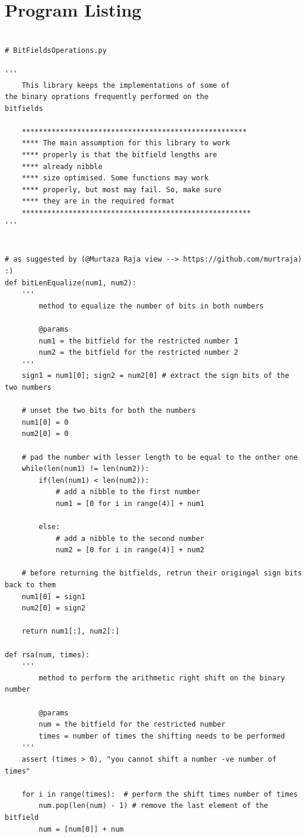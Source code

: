 \documentclass[10pt,a4paper]{article}
\newenvironment{changemargin}[2]{%
\begin{list}{}{%
\setlength{\topsep}{0pt}%
\setlength{\leftmargin}{#1}%
\setlength{\rightmargin}{#2}%
\setlength{\listparindent}{\parindent}%
\setlength{\itemindent}{\parindent}%
\setlength{\parsep}{\parskip}%
}%
\item[]}{\end{list}}
\begin{document}
\newpage
\begin{changemargin}{-4cm}{-4cm}
\section{Program Listing}
\begin{lstlisting}

# BitFieldsOperations.py

'''
	This library keeps the implementations of some of 
the binary oprations frequently performed on the 
bitfields

	*****************************************************
	**** The main assumption for this library to work 
	**** properly is that the bitfield lengths are 	
	**** already nibble
	**** size optimised. Some functions may work 
	**** properly, but most may fail. So, make sure 	
	**** they are in the required format	
	******************************************************
'''


# as suggested by (@Murtaza Raja view --> https://github.com/murtraja) :)
def bitLenEqualize(num1, num2):
	'''
		method to equalize the number of bits in both numbers
			
		@params
		num1 = the bitfield for the restricted number 1
		num2 = the bitfield for the restricted number 2
	'''
	sign1 = num1[0]; sign2 = num2[0] # extract the sign bits of the two numbers
	
	# unset the two bits for both the numbers
	num1[0] = 0
	num2[0] = 0 
	
	# pad the number with lesser length to be equal to the onther one
	while(len(num1) != len(num2)):
		if(len(num1) < len(num2)):
			# add a nibble to the first number
			num1 = [0 for i in range(4)] + num1

		else: 
			# add a nibble to the second number
			num2 = [0 for i in range(4)] + num2

	# before returning the bitfields, retrun their origingal sign bits back to them
	num1[0] = sign1
	num2[0] = sign2

	return num1[:], num2[:]

def rsa(num, times):
	'''
		method to perform the arithmetic right shift on the binary number
			
		@params
		num = the bitfield for the restricted number
		times = number of times the shifting needs to be performed
	'''
	assert (times > 0), "you cannot shift a number -ve number of times"

	for i in range(times):	# perform the shift times number of times
		num.pop(len(num) - 1) # remove the last element of the bitfield
		num = [num[0]] + num
		

\end{lstlisting}
\end{changemargin}
\end{document}
